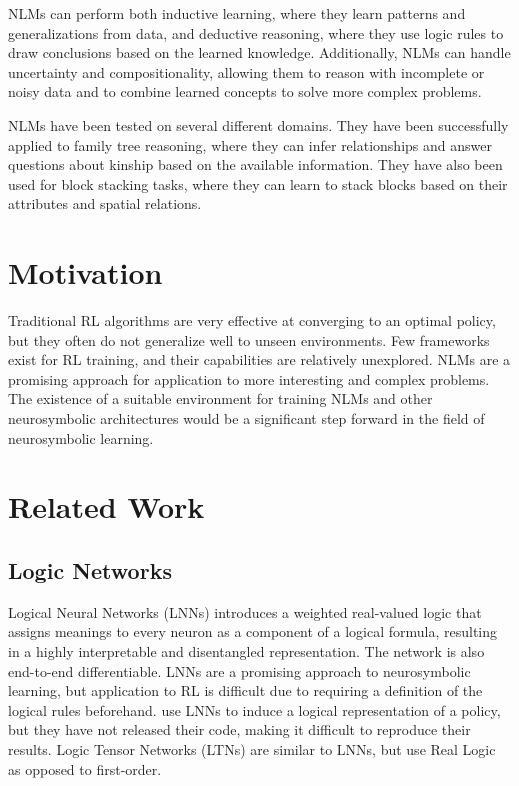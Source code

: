 \documentclass{article}
\begin{document}
NLMs can perform both inductive learning, where they learn patterns and generalizations from data, and deductive reasoning, where they use logic rules to draw conclusions based on the learned knowledge. Additionally, NLMs can handle uncertainty and compositionality, allowing them to reason with incomplete or noisy data and to combine learned concepts to solve more complex problems.

NLMs have been tested on several different domains. They have been successfully applied to family tree reasoning, where they can infer relationships and answer questions about kinship based on the available information. They have also been used for block stacking tasks, where they can learn to stack blocks based on their attributes and spatial relations.
\section{Motivation}

Traditional RL algorithms are very effective at converging to an optimal policy, but they often do not generalize well to unseen environments. Few frameworks exist for RL training, and their capabilities are relatively unexplored. NLMs are a promising approach for application to more interesting and complex problems. The existence of a suitable environment for training NLMs and other neurosymbolic architectures would be a significant step forward in the field of neurosymbolic learning.

\section{Related Work}

\subsection{Logic Networks}

Logical Neural Networks (LNNs) introduces a weighted real-valued logic that assigns meanings to every neuron as a component of a logical formula, resulting in a highly interpretable and disentangled representation. The network is also end-to-end differentiable. LNNs are a promising approach to neurosymbolic learning, but application to RL is difficult due to requiring a definition of the logical rules beforehand. \cite{sen2021neurosymbolic} use LNNs to induce a logical representation of a policy, but they have not released their code, making it difficult to reproduce their results. Logic Tensor Networks (LTNs) \cite{serafini2016logic} are similar to LNNs, but use Real Logic as opposed to first-order.
\end{document}
